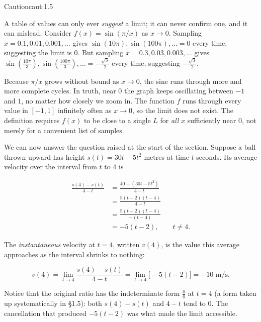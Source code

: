 \documentclass[a4paper,12pt,oneside]{memoir}
\begin{document}
\begin{envcaution}{Caution}{caut:1.5}{}
\begin{raggedpara}
A table of values can only ever \emph{suggest} a limit; it can never confirm one, and it can mislead. Consider \(f(x) = \sin(\pi / x)\) as \(x \to 0\). Sampling \(x = 0.1, 0.01, 0.001, \dots\) gives \(\sin(10\pi), \sin(100\pi), \dots = 0\) every time, suggesting the limit is \(0\). But sampling \(x = 0.3, 0.03, 0.003, \dots\) gives \(\sin\!\left(\tfrac{10\pi}{3}\right), \sin\!\left(\tfrac{100\pi}{3}\right), \dots = -\tfrac{\sqrt{3}}{2}\) every time, suggesting \(-\tfrac{\sqrt{3}}{2}\).
\end{raggedpara}
\begin{raggedpara}
Because \(\pi / x\) grows without bound as \(x \to 0\), the sine runs through more and more complete cycles. In truth, near \(0\) the graph keeps oscillating between \(-1\) and \(1\), no matter how closely we zoom in. The function \(f\) runs through every value in \([-1, 1]\) infinitely often as \(x \to 0\), so the limit does not exist. The definition requires \(f(x)\) to be close to a single \(L\) for \emph{all} \(x\) sufficiently near \(0\), not merely for a convenient list of samples.
\end{raggedpara}
\end{envcaution}
We can now answer the question raised at the start of the section. Suppose a ball thrown upward has height \(s(t) = 30t - 5t^{2}\) metres at time \(t\) seconds. Its average velocity over the interval from \(t\) to \(4\) is

\[ \begin{aligned}
    \frac{s(4) - s(t)}{4 - t}
      &= \frac{40 - (30t - 5t^{2})}{4 - t} \\[2pt]
      &= \frac{5(t - 2)(t - 4)}{4 - t} \\[2pt]
      &= \frac{5(t - 2)(t - 4)}{-(t - 4)} \\[2pt]
      &= -5(t - 2), \qquad t \neq 4.
  \end{aligned} \]

The \emph{instantaneous} velocity at \(t = 4\), written \(v(4)\), is the value this average approaches as the interval shrinks to nothing:

\[ v(4) = \lim_{t \to 4} \frac{s(4) - s(t)}{4 - t} = \lim_{t \to 4} \bigl[-5(t - 2)\bigr] = -10 \text{ m/s}. \]

Notice that the original ratio has the indeterminate form \(\tfrac{0}{0}\) at \(t = 4\) (a form taken up systematically in §1.5): both \(s(4) - s(t)\) and \(4 - t\) tend to \(0\). The cancellation that produced \(-5(t - 2)\) was what made the limit accessible.
\end{document}
